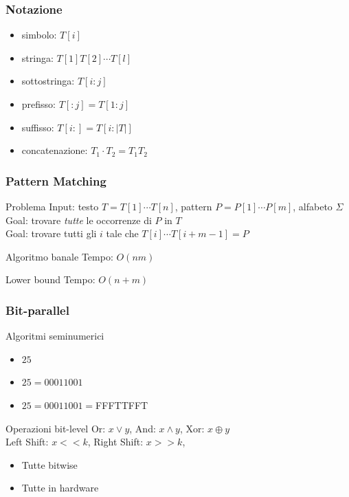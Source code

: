 \begin{frame}[fragile]
\frametitle{Notazione}
\begin{itemize}
\item
\alert{simbolo}: $T[i]$\\
\item
\alert{stringa}: $T[1]T[2]\cdots T[l]$\\
\item
\alert{sottostringa}: $T[i:j]$\\
\item
\alert{prefisso}: $T[:j]=T[1:j]$\\
\item
\alert{suffisso}: $T[i:]=T[i:|T|]$
\item
\alert{concatenazione}: $T_{1}\cdot T_{2} = T_{1}T_{2}$
\end{itemize}
\end{frame}


\begin{frame}[fragile]
\frametitle{Pattern Matching}
\begin{block}{Problema}
\alert{Input}: testo $T=T[1]\cdots T[n]$, pattern $P=P[1]\cdots P[m]$, alfabeto $\Sigma$\\
\alert{Goal}: trovare \emph{tutte} le occorrenze di $P$ in $T$\\
\alert{Goal}: trovare tutti gli $i$ tale che $T[i]\cdots T[i+m-1]=P$
\end{block}
\begin{block}{Algoritmo banale}
\alert{Tempo}: $O(nm)$
\end{block}
\begin{block}{Lower bound}
\alert{Tempo}: $O(n+m)$
\end{block}
\end{frame}

\begin{frame}
\frametitle{Bit-parallel}
\begin{block}{Algoritmi seminumerici}
\begin{itemize}
\item
$25$
\item
$25=00011001$
\item
$25=00011001=$FFFTTFFT
\end{itemize}
\end{block}
\begin{block}{Operazioni bit-level}
\alert{Or}: $x\lor y$, \alert{And}: $x\land y$, \alert{Xor}: $x\oplus y$\\
\alert{Left Shift}: $x << k$, \alert{Right Shift}: $x >> k$,
\begin{itemize}
\item
Tutte bitwise
\item
Tutte in hardware
\end{itemize}
\end{block}
\end{frame}

